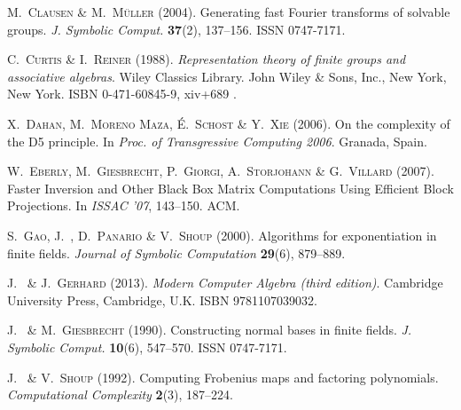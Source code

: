 \begin{thebibliography}{36}
\textsc{M.~Clausen} \& \textsc{M.~M\"{u}ller} (2004).
\newblock Generating fast {F}ourier transforms of solvable groups.
\newblock \emph{J. Symbolic Comput.} \textbf{37}(2), 137--156.
\newblock ISSN 0747-7171.

\textsc{C.~Curtis} \& \textsc{I.~Reiner} (1988).
\newblock \emph{Representation theory of finite groups and associative
  algebras}.
\newblock Wiley Classics Library. John Wiley \& Sons, Inc., New York, New York.
\newblock ISBN 0-471-60845-9, xiv+689 .

\textsc{X.~{Dahan}}, \textsc{M.~{{Moreno Maza}}}, \textsc{{\'E}.~{Schost}} \&
  \textsc{Y.~{Xie}} (2006).
\newblock On the complexity of the {{D5}} principle.
\newblock In \emph{Proc. of {\em Transgressive Computing 2006}}. Granada,
  Spain.

\textsc{W.~Eberly}, \textsc{M.~Giesbrecht}, \textsc{P.~Giorgi},
  \textsc{A.~Storjohann} \& \textsc{G.~Villard} (2007).
\newblock Faster Inversion and Other Black Box Matrix Computations Using
  Efficient Block Projections.
\newblock In \emph{ISSAC '07}, 143--150. ACM.

\textsc{S.~Gao}, \textsc{J.~}, \textsc{D.~Panario} \&
  \textsc{V.~Shoup} (2000).
\newblock Algorithms for exponentiation in finite fields.
\newblock \emph{Journal of Symbolic Computation} \textbf{29}(6), 879--889.

\textsc{J.~} \& \textsc{J.~Gerhard} (2013).
\newblock \emph{Modern Computer Algebra (third edition)}.
\newblock Cambridge University Press, Cambridge, U.K.
\newblock ISBN 9781107039032.

\textsc{J.~} \& \textsc{M.~Giesbrecht} (1990).
\newblock Constructing normal bases in finite fields.
\newblock \emph{J. Symbolic Comput.} \textbf{10}(6), 547--570.
\newblock ISSN 0747-7171.

\textsc{J.~} \& \textsc{V.~Shoup} (1992).
\newblock Computing {F}robenius maps and factoring polynomials.
\newblock \emph{Computational Complexity} \textbf{2}(3), 187--224.


\end{thebibliography}

